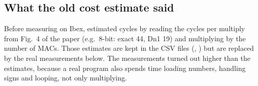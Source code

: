 \subsection{What the old cost estimate said}

Before measuring on Ibex,  estimated cycles by reading the cycles per multiply from
Fig.~4 of the paper (e.g.\ 8-bit: exact 44, Dn1 19) and multiplying by the number of MACs. Those
estimates are kept in the CSV files (, ) but are replaced by the
real measurements below. The measurements turned out higher than the estimates, because a real program
also spends time loading numbers, handling signs and looping, not only multiplying.
\newpage
